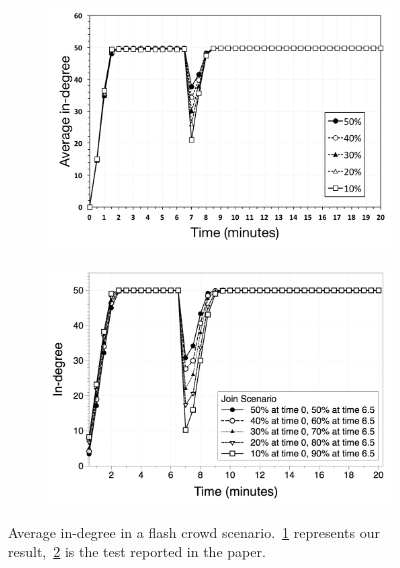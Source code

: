 \begin{figure}
\centering
\begin{subfigure}{.5\textwidth}
  \centering
  \includegraphics[keepaspectratio=true, width=1\linewidth]{images/average_indegree}
  \caption{}
  \label{fig:average_indegree}
\end{subfigure}%
\begin{subfigure}{.5\textwidth}
  \centering
  \includegraphics[keepaspectratio=true, width=1\linewidth]{images/paper_average_indegree}
  \caption{}
  \label{fig:paper_average_indegree}
\end{subfigure}
\caption{Average in-degree in a flash crowd scenario.~\ref{fig:average_indegree} represents our result,~\ref{fig:paper_average_indegree} is the test reported in the paper.}
\label{fig:robustness_indegree_flash_crowd}
\end{figure}

